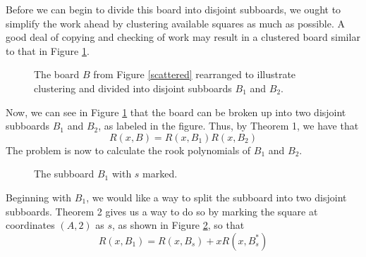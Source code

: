 \documentclass{article}
\newcommand{\w}{0.5}
\newcommand{\ww}{0.25}
\newcommand{\drawgrid}[2]{\draw[step=\w cm,black,thin] (0,0) grid (#1*\w,#2*\w);}
\newcommand{\labelcol}[2]{\draw (#1*\w cm - \ww cm, 0 cm) node[anchor=north] {#2};}
\newcommand{\labelrow}[2]{\draw (0 cm, #1*\w cm - \ww cm) node[anchor=east] {#2};}
\newcommand{\places}[2]{\draw (#1*\w cm - \ww cm, #2*\w cm - \ww cm) node {$s$};}
\newcommand{\placelabel}[3]{\draw (#1*\w cm - \ww cm, #2*\w cm - \ww cm) node {#3};}
\newcommand{\shadesquare}[2]{\filldraw[fill=gray!40!white, draw=black] (#1*\w - \w,#2*\w - \w) rectangle (#1*\w,#2*\w);}
\begin{document}
Before we can begin to divide this board into disjoint subboards, we ought to simplify the work ahead by clustering available squares as much as possible. A good deal of copying and checking of work may result in a clustered board similar to that in Figure \ref{organized}.

\begin{figure}[!h]
    \centering
    \caption{The board $B$ from Figure \ref{scattered} rearranged to illustrate clustering and divided into disjoint subboards $B_1$ and $B_2$.}
    \label{organized}
\end{figure}

Now, we can see in Figure \ref{organized} that the board can be broken up into two disjoint subboards $B_1$ and $B_2$, as labeled in the figure. Thus, by Theorem 1, we have that $$R(x,B) = R(x,B_1)R(x,B_2)$$
The problem is now to calculate the rook polynomials of $B_1$ and $B_2$.

\begin{figure}[!h]
    \centering
    \caption{The subboard $B_1$ with $s$ marked.}
    \label{B1}
\end{figure}

Beginning with $B_1$, we would like a way to split the subboard into two disjoint subboards. Theorem 2 gives us a way to do so by marking the square at coordinates $(A,2)$ as $s$, as shown in Figure \ref{B1}, so that $$R(x,B_1) = R(x,B_s) + xR(x,B_s^*)$$
\end{document}
